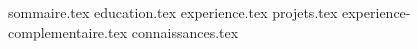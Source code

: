 \documentclass[11pt, a4paper]{awesome-cv}
\newcommand*{\sectiondir}{resume/}
\begin{document}
\makecvheader

{sommaire.tex}
{education.tex}
{experience.tex}
\newpage
{projets.tex}
{experience-complementaire.tex}
{connaissances.tex}
\end{document}
